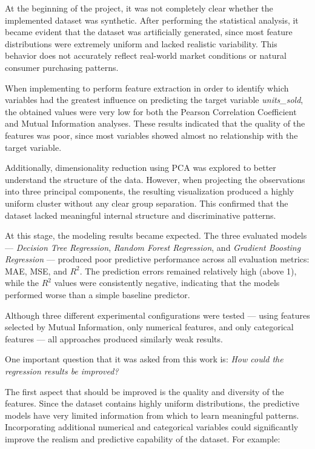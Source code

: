 \documentclass[12pt]{article}
\begin{document}
At the beginning of the project, it was not completely clear whether the implemented dataset was synthetic. After performing the statistical analysis, it became evident that the dataset was artificially generated, since most feature distributions were extremely uniform and lacked realistic variability. This behavior does not accurately reflect real-world market conditions or natural consumer purchasing patterns.

When implementing to perform feature extraction in order to identify which variables had the greatest influence on predicting the target variable \textit{units\_sold}, the obtained values were very low for both the Pearson Correlation Coefficient and Mutual Information analyses. These results indicated that the quality of the features was poor, since most variables showed almost no relationship with the target variable.

Additionally, dimensionality reduction using PCA was explored to better understand the structure of the data. However, when projecting the observations into three principal components, the resulting visualization produced a highly uniform cluster without any clear group separation. This confirmed that the dataset lacked meaningful internal structure and discriminative patterns.

At this stage, the modeling results became expected. The three evaluated models --- \textit{Decision Tree Regression}, \textit{Random Forest Regression}, and \textit{Gradient Boosting Regression} --- produced poor predictive performance across all evaluation metrics: MAE, MSE, and $R^2$. The prediction errors remained relatively high (above 1), while the $R^2$ values were consistently negative, indicating that the models performed worse than a simple baseline predictor.

Although three different experimental configurations were tested --- using features selected by Mutual Information, only numerical features, and only categorical features --- all approaches produced similarly weak results.

One important question that it was asked from this work is: \textit{How could the regression results be improved?}

The first aspect that should be improved is the quality and diversity of the features. Since the dataset contains highly uniform distributions, the predictive models have very limited information from which to learn meaningful patterns. Incorporating additional numerical and categorical variables could significantly improve the realism and predictive capability of the dataset. For example:
\end{document}
